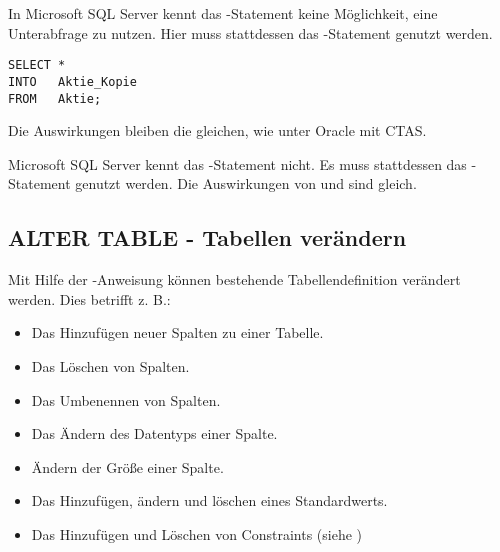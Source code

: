           In Microsoft SQL Server kennt das -Statement keine M\"oglichkeit, eine Unterabfrage zu nutzen. Hier muss stattdessen das -Statement genutzt werden.
        \begin{lstlisting}[language=ms_sql,caption={MS SQL Server - SELECT INTO},label=sql08_06]
SELECT *
INTO   Aktie_Kopie
FROM   Aktie;
        \end{lstlisting}
        Die Auswirkungen bleiben die gleichen, wie unter Oracle mit CTAS.
        \begin{merke}
          Microsoft SQL Server kennt das -Statement nicht. Es muss stattdessen das -Statement genutzt werden. Die Auswirkungen von  und  sind gleich.
        \end{merke}
      \subsection{ALTER TABLE - Tabellen ver\"andern}
        Mit Hilfe der -Anweisung k\"onnen bestehende Tabellendefinition ver\"andert werden. Dies betrifft z. B.:
        \begin{itemize}
          \item Das Hinzuf\"ugen neuer Spalten zu einer Tabelle.
          \item Das L\"oschen von Spalten.
          \item Das Umbenennen von Spalten.
          \item Das \"Andern des Datentyps einer Spalte.
          \item \"Andern der Gr\"o\ss e einer Spalte.
          \item Das Hinzuf\"ugen, \"andern und l\"oschen eines Standardwerts.
          \item Das Hinzuf\"ugen und L\"oschen von Constraints (siehe )
        \end{itemize}
